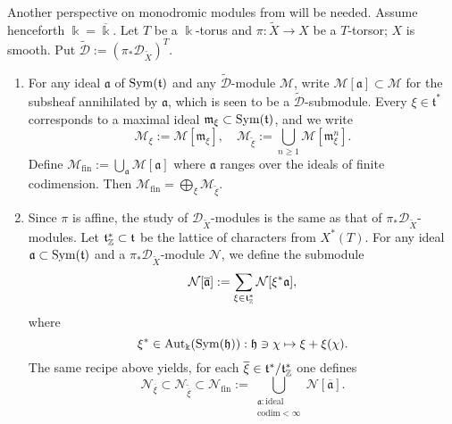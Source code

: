 \documentclass[12pt, a3paper, openany]{book}
\begin{document}
Another perspective on monodromic modules from \cite[2.5]{BB93} will be needed. Assume henceforth $\Bbbk = \overline{\Bbbk}$. Let $T$ be a $\Bbbk$-torus and $\pi: \tilde{X} \to X$ be a $T$-torsor; $X$ is smooth. Put $\widetilde{\mathscr{D}} := (\pi_* \mathscr{D}_{\tilde{X}})^T$.
\begin{enumerate}
	\item For any ideal $\mathfrak{a}$ of $\operatorname{Sym}(\mathfrak{t})$ and any $\widetilde{\mathscr{D}}$-module $\mathcal{M}$, write $\mathcal{M}[\mathfrak{a}] \subset \mathcal{M}$ for the subsheaf annihilated by $\mathfrak{a}$, which is seen to be a $\tilde{\mathscr{D}}$-submodule. Every $\xi \in \mathfrak{t}^*$ corresponds to a maximal ideal $\mathfrak{m}_\xi \subset \operatorname{Sym}(\mathfrak{t})$, and we write
	\[ \mathcal{M}_\xi := \mathcal{M}[\mathfrak{m}_\xi], \quad \mathcal{M}_{\tilde{\xi}} := \bigcup_{n \geq 1} \mathcal{M}[\mathfrak{m}_\xi^n]. \]
	Define $\mathcal{M}_{\text{fin}} := \bigcup_{\mathfrak{a}} \mathcal{M}[\mathfrak{a}]$ where $\mathfrak{a}$ ranges over the ideals of finite codimension. Then $\mathcal{M}_{\mathrm{fin}} = \bigoplus_\xi \mathcal{M}_{\tilde{\xi}}$.

	\item Since $\pi$ is affine, the study of $\mathscr{D}_{\tilde{X}}$-modules is the same as that of $\pi_* \mathscr{D}_{\tilde{X}}$-modules. Let $\mathfrak{t}^*_{\mathbb{Z}} \subset \mathfrak{t}$ be the lattice of characters from $X^*(T)$. For any ideal $\mathfrak{a} \subset \operatorname{Sym}(\mathfrak{t})$ and a $\pi_* \mathscr{D}_{\tilde{X}}$-module $\mathcal{N}$, we define the submodule
	\begin{equation*}
		\mathcal{N}[\overline{\mathfrak{a}}] := \sum_{\xi \in \mathfrak{t}^*_{\mathbb{Z}}} \mathcal{N}[\xi^* \mathfrak{a}],
	\end{equation*}
	where
	\begin{equation*}
		\xi^* \in \operatorname{Aut}_{\Bbbk}(\operatorname{Sym}(\mathfrak{h})): \mathfrak{h} \ni \chi \mapsto \xi + \xi(\chi).
	\end{equation*}
	The same recipe above yields, for each $\overline{\xi} \in \mathfrak{t}^*/\mathfrak{t}^*_{\mathbb{Z}}$ one defines
	\[ \mathcal{N}_{\overline{\xi}} \subset \mathcal{N}_{\widetilde{\overline{\xi}}} \subset \mathcal{N}_{\mathrm{fin}} := \bigcup_{\substack{\mathfrak{a}: \text{ideal} \\ \mathrm{codim} < \infty}} \mathcal{N}[\overline{\mathfrak{a}}]. \]
\end{enumerate}
\end{document}
